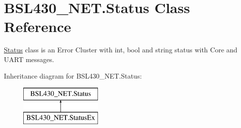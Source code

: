 \hypertarget{class_b_s_l430___n_e_t_1_1_status}{}\section{B\+S\+L430\+\_\+\+N\+E\+T.\+Status Class Reference}
\label{class_b_s_l430___n_e_t_1_1_status}


\mbox{\hyperlink{class_b_s_l430___n_e_t_1_1_status}{Status}} class is an Error Cluster with int, bool and string status with Core and U\+A\+RT messages.  


Inheritance diagram for B\+S\+L430\+\_\+\+N\+E\+T.\+Status\+:\begin{figure}[H]
\begin{center}
\leavevmode
\includegraphics[height=2.000000cm]{class_b_s_l430___n_e_t_1_1_status}
\end{center}
\end{figure}

